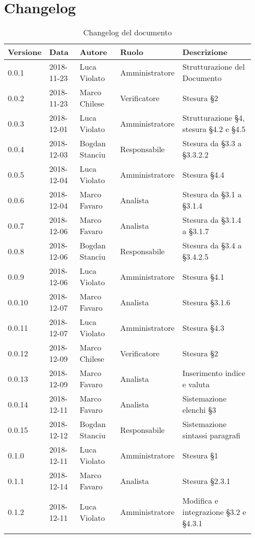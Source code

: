 \section{Changelog}

\begin{center}
\begin{longtable}[c]{|m{}|m{}|m{}|m{}|p{}|}
\hline
\textbf{Versione} & \textbf{Data} & \textbf{Autore} & \textbf{Ruolo} & \textbf{Descrizione} \\
\hline \hline
\endfirsthead
0.0.1 & 2018-11-23 & Luca Violato & Amministratore & Strutturazione del Documento \\
\hline
0.0.2 & 2018-11-23 & Marco Chilese & Verificatore & Stesura §2\\
\hline
0.0.3 & 2018-12-01 & Luca Violato & Amministratore & Strutturazione §4, stesura §4.2 e §4.5 \\
\hline
0.0.4 & 2018-12-03 & Bogdan Stanciu & Responsabile & Stesura da §3.3 a §3.3.2.2 \\
\hline
0.0.5 & 2018-12-04 & Luca Violato & Amministratore & Stesura §4.4 \\
\hline
0.0.6 & 2018-12-04 & Marco Favaro & Analista & Stesura da §3.1 a §3.1.4 \\
\hline
0.0.7 & 2018-12-06 & Marco Favaro & Analista & Stesura da §3.1.4 a §3.1.7 \\
\hline
0.0.8 & 2018-12-06 & Bogdan Stanciu & Responsabile & Stesura da §3.4 a §3.4.2.5 \\
\hline
0.0.9 & 2018-12-06 & Luca Violato & Amministratore & Stesura §4.1\\
\hline
0.0.10 & 2018-12-07 & Marco Favaro & Analista & Stesura §3.1.6\\
\hline
0.0.11 & 2018-12-07 & Luca Violato & Amministratore & Stesura §4.3\\
\hline
0.0.12 & 2018-12-09 & Marco Chilese & Verificatore & Stesura §2\\
\hline
0.0.13 & 2018-12-09 & Marco Favaro & Analista & Inserimento indice e valuta\\
\hline
0.0.14 & 2018-12-11 & Marco Favaro & Analista & Sistemazione elenchi §3\\
\hline
0.0.15 & 2018-12-12 & Bogdan Stanciu & Responsabile & Sistemazione sintassi paragrafi\\
\hline
0.1.0 & 2018-12-11 & Luca Violato & Amministratore & Stesura §1\\
\hline
0.1.1 & 2018-12-14 & Marco Favaro & Analista & Stesura §2.3.1\\
\hline
0.1.2 & 2018-12-11 & Luca Violato & Amministratore & Modifica e integrazione §3.2 e §4.3.1\\
\hline
\caption{Changelog del documento}
\end{longtable}
\end{center}